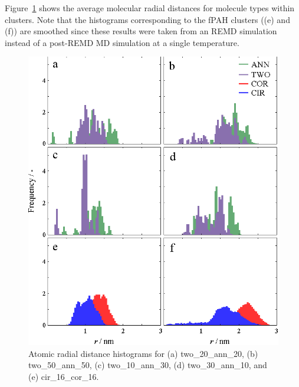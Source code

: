 Figure~\ref{figSI:radialdists_molec} shows the average molecular radial distances for molecule types within clusters. Note that the histograms corresponding to the fPAH clusters ((e) and (f)) are smoothed since these results were taken from an REMD simulation instead of a post-REMD MD simulation at a single temperature.
%
\begin{figure}[!tbh]
\centering
\includegraphics[width=0.5\linewidth]{Figures/molec_histograms.eps}
\caption{Atomic radial distance histograms for (a) two\_20\_ann\_20, (b) two\_50\_ann\_50, (c) two\_10\_ann\_30, (d) two\_30\_ann\_10, and (e) cir\_16\_cor\_16.}
\label{figSI:radialdists_molec}
\end{figure}
%

\newpage